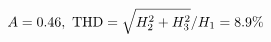 \documentclass[preview]{standalone}
\begin{document}
\begin{align*}
\special{dvisvgm:raw <g id='unique000'>}A=0.46,\ \text{THD}=\sqrt{H_2^2+H_3^2}/H_1=8.9\%\special{dvisvgm:raw </g>}
\end{align*}
\end{document}
